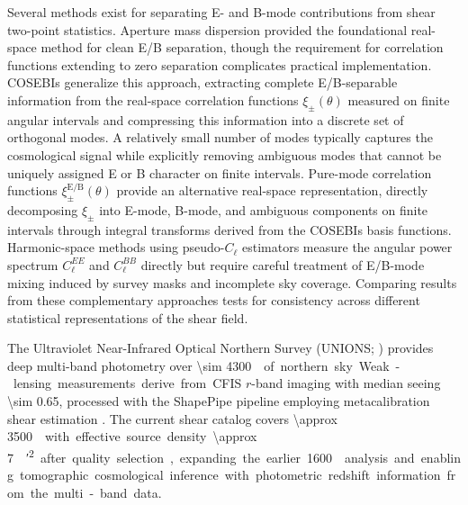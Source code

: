 \documentclass{aa}
\begin{document}
Several methods exist for separating E- and B-mode contributions from shear two-point statistics. Aperture mass dispersion \citep{schneider96, kaiser98} provided the foundational real-space method for clean E/B separation, though the requirement for correlation functions extending to zero separation complicates practical implementation. COSEBIs \citep{schneider.eifler.krause10, asgari.schneider.simon12} generalize this approach, extracting complete E/B-separable information from the real-space correlation functions $\xi_\pm(\theta)$ measured on finite angular intervals and compressing this information into a discrete set of orthogonal modes. A relatively small number of modes typically captures the cosmological signal while explicitly removing ambiguous modes that cannot be uniquely assigned E or B character on finite intervals. Pure-mode correlation functions $\xi_\pm^{\mathrm{E/B}}(\theta)$ \citep{schneider.etal22} provide an alternative real-space representation, directly decomposing $\xi_\pm$ into E-mode, B-mode, and ambiguous components on finite intervals through integral transforms derived from the COSEBIs basis functions. Harmonic-space methods using pseudo-$C_\ell$ estimators measure the angular power spectrum $C_\ell^{EE}$ and $C_\ell^{BB}$ directly but require careful treatment of E/B-mode mixing induced by survey masks and incomplete sky coverage. Comparing results from these complementary approaches tests for consistency across different statistical representations of the shear field.

The Ultraviolet Near-Infrared Optical Northern Survey (UNIONS; \citealt{gwyn.etal25}) provides deep multi-band photometry over \SI{\sim 4300}{\square\deg} of northern sky. Weak-lensing measurements derive from CFIS $r$-band imaging with median seeing \SI{\sim 0.65}{\arcsec}, processed with the ShapePipe pipeline employing metacalibration shear estimation \citep{farrens.etal22, guinot.etal22}. The current shear catalog covers \SI{\approx 3500}{\square\deg} with effective source density \SI{\approx 7}{\per\square\arcmin} after quality selection, expanding the earlier \SI{1600}{\square\deg} analysis and enabling tomographic cosmological inference with photometric redshift information from the multi-band data.
\end{document}
